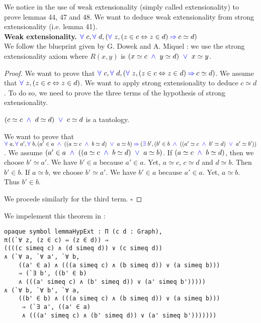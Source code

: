 \documentclass[a4paper]{article}
\begin{document}
\label{extensionality}

We notice in \cite{zermodulo53} the use of weak extensionality (simply called extensionality) to prove lemmas 44, 47 and 48. We want to deduce weak extensionality from strong extensionality (i.e. lemma 41). \\

\textbf{Weak extensionality.} ${\color{blue} \forall}~c,{\color{blue} \forall}~d, ({\color{blue} \forall}~z, (z \in c \Leftrightarrow z \in d) \mathbin{\color{blue} \Rightarrow} c \simeq d)$ \\

We follow the blueprint given by G. Dowek and A. Miquel \cite[see][Proposition 1]{zermodulo} : we use the strong extensionality axiom where $R(x,y)$ is $(x \simeq c~\mathbin{\color{blue} \wedge}~y \simeq d)~\mathbin{\color{blue} \vee}~x \simeq y$. \\

\begin{proof}
We want to prove that ${\color{blue} \forall}~c,{\color{blue} \forall}~d, ({\color{blue} \forall}~z, (z \in c \Leftrightarrow z \in d) \mathbin{\color{blue} \Rightarrow} c \simeq d)$. We assume that ${\color{blue} \forall}~z, (z \in c \Leftrightarrow z \in d)$. We want to apply strong extensionality to deduce $c \simeq d$. To do so, we need to prove the three terms of the hypothesis of strong extensionality.

$(c \simeq c~\mathbin{\color{blue} \wedge}~d \simeq d)~\mathbin{\color{blue} \vee}~c \simeq d$ is a tautology.

We want to prove that ${\color{blue} \forall}~a,{\color{blue} \forall}~a',{\color{blue} \forall}~b, (a' \in a~\mathbin{\color{blue} \wedge}~((a \simeq c~\mathbin{\color{blue} \wedge}~b \simeq d)~\mathbin{\color{blue} \vee}~a \simeq b) \mathbin{\color{blue} \Rightarrow} ({\color{blue} \exists}~b', (b' \in b~\mathbin{\color{blue} \wedge}~((a' \simeq c~\mathbin{\color{blue} \wedge}~b' \simeq d)~\mathbin{\color{blue} \vee}~a' \simeq b'))$. We assume $(a' \in a~\mathbin{\color{blue} \wedge}~((a \simeq c~\mathbin{\color{blue} \wedge}~b \simeq d)~\mathbin{\color{blue} \vee}~a \simeq b)$. If $(a \simeq c~\mathbin{\color{blue} \wedge}~b \simeq d)$, then we choose $b' \simeq a'$. We have $b' \in a$ because $a' \in a$. Yet, $a \simeq c$, $c \simeq d$ and $d \simeq b$. Then $b' \in b$. If $a \simeq b$, we choose $b' \simeq a'$. We have $b' \in a$ because $a' \in a$. Yet, $a \simeq b$. Thus $b' \in b$.

We procede similarly for the third term. $\square$
\end{proof}

We impelement this theorem in \dedukti:

\begin{lstlisting}
opaque symbol lemmaHypExt : Π (c d : Graph), 
π((`∀ z, (z ∈ c) ⇔ (z ∈ d)) ⇒ 
((((c simeq c) ∧ (d simeq d)) ∨ (c simeq d))
∧ (`∀ a, `∀ a', `∀ b, 
	((a' ∈ a) ∧ (((a simeq c) ∧ (b simeq d)) ∨ (a simeq b))) 
	⇒ (`∃ b', ((b' ∈ b) 
	∧ (((a' simeq c) ∧ (b' simeq d)) ∨ (a' simeq b')))))
∧ (`∀ b, `∀ b', `∀ a, 
	((b' ∈ b) ∧ (((a simeq c) ∧ (b simeq d)) ∨ (a simeq b)))
	 ⇒ (`∃ a', ((a' ∈ a) 
	 ∧ (((a' simeq c) ∧ (b' simeq d)) ∨ (a' simeq b')))))))
\end{lstlisting}
\end{document}
